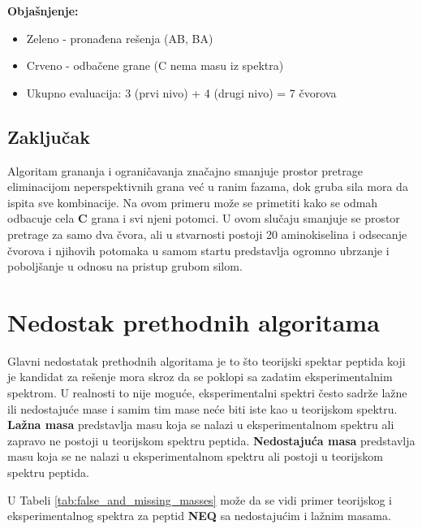 \documentclass[12pt,oneside]{memoir}
\begin{document}
\textbf{Objašnjenje:}
\begin{itemize}
    \item \textcolor{green!50!black}{Zeleno} - pronađena rešenja (AB, BA)
    \item \textcolor{red!50!black}{Crveno} - odbačene grane (C nema masu iz spektra)
    \item Ukupno evaluacija: 3 (prvi nivo) + 4 (drugi nivo) = 7 čvorova
\end{itemize}

\subsection{Zaključak}

Algoritam grananja i ograničavanja značajno smanjuje prostor pretrage eliminacijom neperspektivnih grana već u ranim fazama, dok gruba sila mora da ispita sve kombinacije.
Na ovom primeru može se primetiti kako se odmah odbacuje cela \textbf{C} grana i svi njeni potomci. U ovom slučaju smanjuje se prostor pretrage za samo dva čvora, ali u stvarnosti postoji 20 aminokiselina i odsecanje čvorova i njihovih potomaka u samom startu predstavlja ogromno ubrzanje i poboljšanje u odnosu na pristup grubom silom.

\section{Nedostak prethodnih algoritama}

Glavni nedostatak prethodnih algoritama je to što teorijski spektar peptida koji je kandidat za rešenje mora skroz da se poklopi sa zadatim eksperimentalnim spektrom. U realnosti to nije moguće, eksperimentalni spektri često sadrže lažne ili nedostajuće mase i samim tim mase neće biti iste kao u teorijskom spektru.
\textbf{Lažna masa} predstavlja masu koja se nalazi u eksperimentalnom spektru ali zapravo ne postoji u teorijskom spektru peptida.
\textbf{Nedostajuća masa} predstavlja masu koja se ne nalazi u eksperimentalnom spektru ali postoji u teorijskom spektru peptida.

U Tabeli \ref{tab:false_and_missing_masses} može da se vidi primer teorijskog i eksperimentalnog spektra za peptid \textbf{NEQ} sa nedostajućim i lažnim masama.
\end{document}
